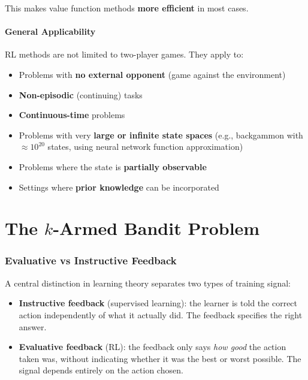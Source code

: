 \documentclass[11pt,a4paper]{article}
\theoremstyle{definition}
\theoremstyle{plain}
\theoremstyle{remark}
\begin{document}
This makes value function methods \textbf{more efficient} in most cases.

\subsection{General Applicability}

RL methods are not limited to two-player games. They apply to:
\begin{itemize}
    \item Problems with \textbf{no external opponent} (game against the environment)
    \item \textbf{Non-episodic} (continuing) tasks
    \item \textbf{Continuous-time} problems
    \item Problems with very \textbf{large or infinite state spaces} (e.g., backgammon with $\approx 10^{20}$ states, using neural network function approximation)
    \item Problems where the state is \textbf{partially observable}
    \item Settings where \textbf{prior knowledge} can be incorporated
\end{itemize}


\part{The $k$-Armed Bandit Problem}

\section{Evaluative vs Instructive Feedback}

A central distinction in learning theory separates two types of training signal:

\begin{itemize}
    \item \textbf{Instructive feedback} (supervised learning): the learner is told the correct action independently of what it actually did. The feedback specifies the right answer.
    \item \textbf{Evaluative feedback} (RL): the feedback only says \emph{how good} the action taken was, without indicating whether it was the best or worst possible. The signal depends entirely on the action chosen.
\end{itemize}
\end{document}
